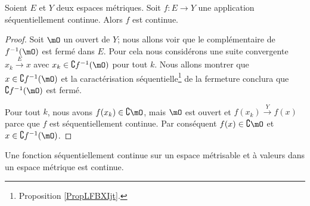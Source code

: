 \begin{proposition} \label{PropXIAQSXr}
    Soient \( E\) et \( Y\) deux espaces métriques. Soit \( f\colon E\to Y\) une application séquentiellement continue. Alors \( f\) est continue.
\end{proposition}

\begin{proof}
    Soit \( \mO\) un ouvert de \( Y\); nous allons voir que le complémentaire de \( f^{-1}(\mO)\) est fermé dans \( E\). Pour cela nous considérons une suite convergente \( x_k\stackrel{E}{\longrightarrow} x\) avec \( x_k\in\complement f^{-1}(\mO)\) pour tout \( k\). Nous allons montrer que \( x\in \complement f^{-1}(\mO)\) et la caractérisation séquentielle\footnote{Proposition \ref{PropLFBXIjt}.} de la fermeture conclura que \( \complement f^{-1}(\mO)\) est fermé.

    Pour tout \( k\), nous avons \( f(x_k)\in\complement \mO\), mais \( \mO\) est ouvert et \( f(x_k)\stackrel{Y}{\longrightarrow}f(x)\) parce que \( f\) est séquentiellement continue. Par conséquent \( f(x)\in\complement \mO\) et \( x\in\complement f^{-1}(\mO)\).
\end{proof}


\begin{proposition} \label{PROPooKNVUooMbLZoy}
    Une fonction séquentiellement continue sur un espace métrisable et à valeurs dans un espace métrique est continue.
\end{proposition}

